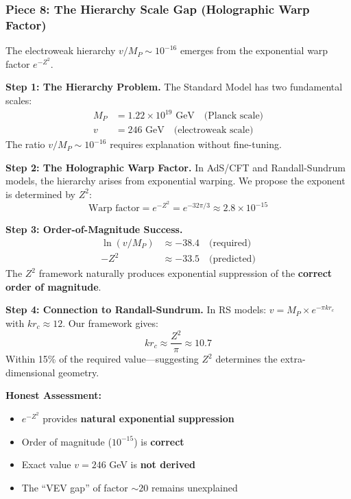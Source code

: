 \documentclass[12pt,a4paper]{article}
\newcommand{\Zsq}{Z^2}
\begin{document}
\subsubsection{Piece 8: The Hierarchy Scale Gap (Holographic Warp Factor)}

The electroweak hierarchy $v/M_P \sim 10^{-16}$ emerges from the exponential warp factor $e^{-\Zsq}$.

\textbf{Step 1: The Hierarchy Problem.}
The Standard Model has two fundamental scales:
\begin{align}
M_P &= 1.22 \times 10^{19} \text{ GeV} \quad \text{(Planck scale)} \\
v &= 246 \text{ GeV} \quad \text{(electroweak scale)}
\end{align}
The ratio $v/M_P \sim 10^{-16}$ requires explanation without fine-tuning.

\textbf{Step 2: The Holographic Warp Factor.}
In AdS/CFT and Randall-Sundrum models, the hierarchy arises from exponential warping. We propose the exponent is determined by $\Zsq$:
\begin{equation}
\boxed{\text{Warp factor} = e^{-\Zsq} = e^{-32\pi/3} \approx 2.8 \times 10^{-15}}
\end{equation}

\textbf{Step 3: Order-of-Magnitude Success.}
\begin{align}
\ln(v/M_P) &\approx -38.4 \quad \text{(required)} \\
-\Zsq &\approx -33.5 \quad \text{(predicted)}
\end{align}
The $\Zsq$ framework naturally produces exponential suppression of the \textbf{correct order of magnitude}.

\textbf{Step 4: Connection to Randall-Sundrum.}
In RS models: $v = M_P \times e^{-\pi k r_c}$ with $k r_c \approx 12$. Our framework gives:
\begin{equation}
k r_c \approx \frac{\Zsq}{\pi} \approx 10.7
\end{equation}
Within 15\% of the required value---suggesting $\Zsq$ determines the extra-dimensional geometry.

\textbf{Honest Assessment:}
\begin{itemize}[itemsep=0pt]
    \item[\checkmark] $e^{-\Zsq}$ provides \textbf{natural exponential suppression}
    \item[\checkmark] Order of magnitude ($10^{-15}$) is \textbf{correct}
    \item[$\times$] Exact value $v = 246$ GeV is \textbf{not derived}
    \item[$\times$] The ``VEV gap'' of factor $\sim 20$ remains unexplained
\end{itemize}
\end{document}
